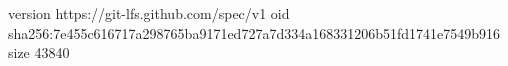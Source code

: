 version https://git-lfs.github.com/spec/v1
oid sha256:7e455c616717a298765ba9171ed727a7d334a168331206b51fd1741e7549b916
size 43840
